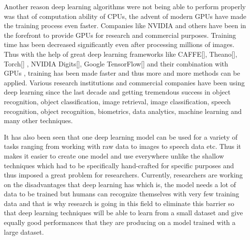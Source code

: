 Another reason deep learning algorithms were not being able to perform properly was that of computation ability of CPUs, the advent of modern GPUs have made the training process even faster. Companies like NVIDIA and others have been in the forefront to provide GPUs for research and commercial purposes. Training time has been decreased significantly even after processing millions of images. Thus with the help of great deep learning frameworks like CAFFE[], Theano[], Torch[] , NVIDIA Digits[], Google TensorFlow[] and their combination with GPUs , training has been made faster and thus more and more methods can be applied. Various research institutions and commercial companies have been using deep learning since the last decade and getting tremendous success in object recognition, object classification, image retrieval, image classification, speech recognition, object recognition, biometrics, data analytics, machine learning and many other techniques.

It has also been seen that one deep learning model can be used for a variety of tasks ranging from working with raw data to images to speech data etc. Thus it makes it easier to create one model and use everywhere unlike the shallow techniques which had to be specifically hand-crafted for specific purposes and thus imposed a great problem for researchers. Currently, researchers are working on the disadvantages that deep learning has which is, the model needs a lot of data to be trained but humans can recognize themselves with very few training data and that is why research is going in this field to eliminate this barrier so that deep learning techniques will be able to learn from a small dataset and give equally good performances that they are producing on a model trained with a large dataset.
